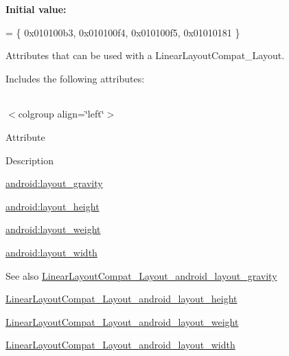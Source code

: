 {\bfseries Initial value\+:}
\begin{DoxyCode}
= \{
            0x010100b3, 0x010100f4, 0x010100f5, 0x01010181
        \}
\end{DoxyCode}
Attributes that can be used with a Linear\+Layout\+Compat\+\_\+\+Layout. 

Includes the following attributes\+:

\tabulinesep=1mm
\begin{longtabu} spread 0pt [c]{*{0}{|X[-1]}|}
\hline
\end{longtabu}
$<$colgroup align=\char`\"{}left\char`\"{}$>$ 

Attribute

Description 

{\ttfamily \hyperlink{classandroid_1_1support_1_1v4_1_1R_1_1styleable_a49d947d9f6e72f06ba5b26a80b223714}{android\+:layout\+\_\+gravity}}

{\ttfamily \hyperlink{classandroid_1_1support_1_1v4_1_1R_1_1styleable_a0249aade0fe24357057c6ac83d2732fb}{android\+:layout\+\_\+height}}

{\ttfamily \hyperlink{classandroid_1_1support_1_1v4_1_1R_1_1styleable_a1059aee9c7c4ec5f7d463b5e086241b5}{android\+:layout\+\_\+weight}}

{\ttfamily \hyperlink{classandroid_1_1support_1_1v4_1_1R_1_1styleable_aa52fa646622d8180cb257bec9b9e78cc}{android\+:layout\+\_\+width}}

\begin{DoxySeeAlso}{See also}
\hyperlink{classandroid_1_1support_1_1v4_1_1R_1_1styleable_a49d947d9f6e72f06ba5b26a80b223714}{Linear\+Layout\+Compat\+\_\+\+Layout\+\_\+android\+\_\+layout\+\_\+gravity} 

\hyperlink{classandroid_1_1support_1_1v4_1_1R_1_1styleable_a0249aade0fe24357057c6ac83d2732fb}{Linear\+Layout\+Compat\+\_\+\+Layout\+\_\+android\+\_\+layout\+\_\+height} 

\hyperlink{classandroid_1_1support_1_1v4_1_1R_1_1styleable_a1059aee9c7c4ec5f7d463b5e086241b5}{Linear\+Layout\+Compat\+\_\+\+Layout\+\_\+android\+\_\+layout\+\_\+weight} 

\hyperlink{classandroid_1_1support_1_1v4_1_1R_1_1styleable_aa52fa646622d8180cb257bec9b9e78cc}{Linear\+Layout\+Compat\+\_\+\+Layout\+\_\+android\+\_\+layout\+\_\+width} 
\end{DoxySeeAlso}
\mbox{\label{classandroid_1_1support_1_1v4_1_1R_1_1styleable_a49d947d9f6e72f06ba5b26a80b223714}} 
